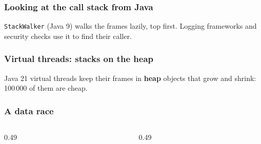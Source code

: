 \documentclass[aspectratio=169,10pt,compress]{beamer}
\begin{document}
\begin{frame}[t,fragile] \frametitle{Looking at the call stack from Java}

  \vspace{0.2em}
  \small \texttt{StackWalker} (Java 9) walks the frames lazily, top first. Logging frameworks and security checks use it to find their caller.
\end{frame}




\begin{frame}[t,fragile] \frametitle{Virtual threads: stacks on the heap}

  \vspace{0.2em}
  \small Java 21 virtual threads keep their frames in \textbf{heap} objects that grow and shrink: 100\,000 of them are cheap.
\end{frame}





\begin{frame}[t,fragile] \frametitle{A data race}
  \begin{columns}[T]
    \begin{column}{0.49\textwidth}
    \end{column}
    \begin{column}{0.49\textwidth}
    \end{column}
  \end{columns}
\end{frame}
\end{document}
